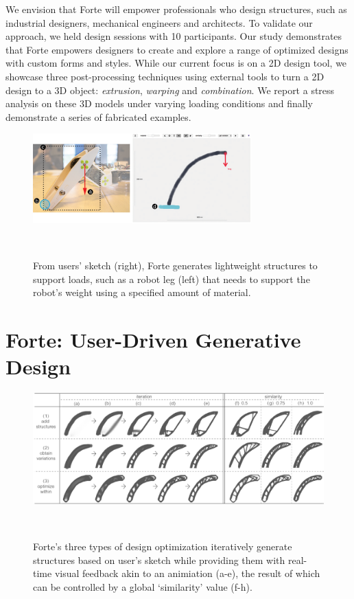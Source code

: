 We envision that Forte will empower professionals who design structures, such as industrial designers, mechanical engineers and architects. To validate our approach, we held design sessions with 10 participants. Our study demonstrates that Forte empowers designers to create and explore a range of optimized designs with custom forms and styles. While our current focus is on a 2D design tool, we showcase three post-processing techniques using external tools to turn a 2D design to a 3D object: \textit{extrusion}, \textit{warping} and \textit{combination}. We report a stress analysis on these 3D models under varying loading conditions and finally demonstrate a series of fabricated examples.


\begin{figure} [h]
  \centering
  \includegraphics[width=0.75\textwidth]{figures/design_scene}
  \caption{From users' sketch (right), Forte generates lightweight structures to support loads, such as a robot leg (left) that needs to support the robot's weight using a specified amount of material.}~\label{fig:design_scene}
\end{figure}

\section{Forte: User-Driven Generative Design}

\begin{figure} [t]
  \centering
  \includegraphics[width=1\textwidth]{figures/all_the_techniques}
  \caption{Forte's three types of design optimization iteratively generate structures based on user's sketch while providing them with real-time visual feedback akin to an animiation (a-e), the result of which can be controlled by a global `similarity' value (f-h).}~\label{fig:techniques}
\end{figure}

